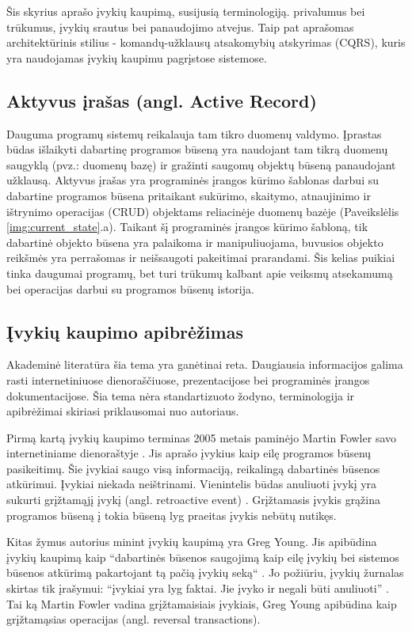 Šis skyrius aprašo įvykių kaupimą, susijusią terminologiją. privalumus bei trūkumus, įvykių srautus bei panaudojimo atvejus. Taip pat aprašomas architektūrinis stilius - komandų-užklausų atsakomybių atskyrimas (CQRS), kuris yra naudojamas įvykių kaupimu pagrįstose sistemose. 

\subsection{Aktyvus įrašas (angl. Active Record)}

Dauguma programų sistemų reikalauja tam tikro duomenų valdymo. Įprastas būdas išlaikyti dabartinę programos būseną yra naudojant tam tikrą duomenų saugyklą (pvz.: duomenų bazę) ir gražinti saugomų objektų būseną panaudojant užklausą. Aktyvus įrašas yra programinės įrangos kūrimo šablonas darbui su dabartine programos būsena pritaikant sukūrimo, skaitymo, atnaujinimo ir ištrynimo operacijas (CRUD) objektams reliacinėje duomenų bazėje \cite{Fowler:2002:PEA:579257} (Paveikslėlis \ref{img:current_state}.a). Taikant šį programinės įrangos kūrimo šabloną, tik dabartinė objekto būsena yra palaikoma ir manipuliuojama, buvusios objekto reikšmės yra perrašomas ir neišsaugoti pakeitimai prarandami. Šis kelias puikiai tinka daugumai programų, bet turi trūkumų kalbant apie veiksmų atsekamumą bei operacijas darbui su programos būsenų istorija.

\subsection{Įvykių kaupimo apibrėžimas}

Akademinė literatūra šia tema yra ganėtinai reta. Daugiausia informacijos galima rasti internetiniuose dienoraščiuose, prezentacijose bei programinės įrangos dokumentacijose. Šia tema nėra standartizuoto žodyno, terminologija ir apibrėžimai skiriasi priklausomai nuo autoriaus.

Pirmą kartą įvykių kaupimo terminas 2005 metais paminėjo Martin Fowler savo internetiniame dienoraštyje \cite{Fowler:EventSourcing}. Jis aprašo įvykius kaip eilę programos būsenų pasikeitimų. Šie įvykiai saugo visą informaciją, reikalingą dabartinės būsenos atkūrimui. Įvykiai niekada neištrinami. Vienintelis būdas anuliuoti įvykį yra sukurti grįžtamąjį įvykį (angl. retroactive event) \cite{Fowler:RetroactiveEvent}. Grįžtamasis įvykis grąžina programos būseną į tokia būseną lyg praeitas įvykis nebūtų nutikęs.

Kitas žymus autorius minint įvykių kaupimą yra Greg Young. Jis apibūdina įvykių kaupimą kaip “dabartinės būsenos saugojimą kaip eilę įvykių bei sistemos būsenos atkūrimą pakartojant tą pačią įvykių seką“ \cite{Young:CQRS2010}. Jo požiūriu, įvykių žurnalas skirtas tik įrašymui: “įvykiai yra lyg faktai. Jie įvyko ir negali būti anuliuoti” \cite{Young:CQRS2013}. Tai ką Martin Fowler vadina grįžtamaisiais įvykiais, Greg Young apibūdina kaip grįžtamąsias operacijas (angl. reversal transactions).

